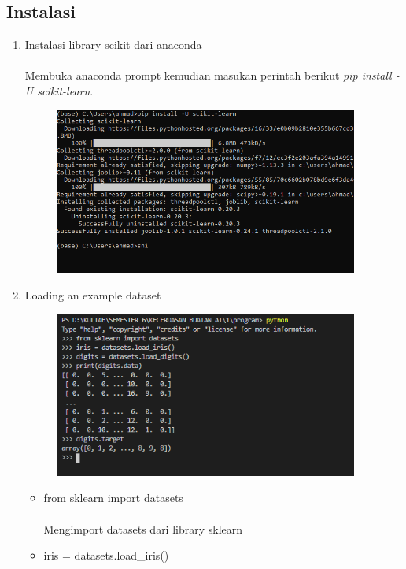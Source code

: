 \documentclass{article}
\begin{document}
    \subsection{Instalasi}
        \begin{enumerate}
            \item Instalasi library scikit dari anaconda
                \paragraph{}Membuka anaconda prompt kemudian masukan perintah berikut \textit{pip install -U scikit-learn}.
                \begin{figure}[ht]
                    \centerline{\includegraphics[width=10cm]{1.PNG}}
                \end{figure}
            \newpage
            \item Loading an example dataset
                \begin{figure}[ht]
                    \centerline{\includegraphics[width=10cm]{2.PNG}}
                \end{figure}
                \begin{itemize}
                    \item from sklearn import datasets
                        \paragraph{}Mengimport datasets dari library sklearn
                    \item iris = datasets.load\_iris()

\end{itemize}
\end{enumerate}
\end{document}
